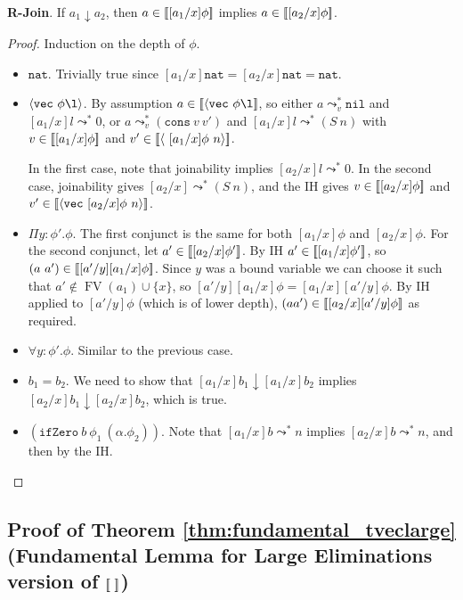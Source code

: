 \documentclass[copyright]{eptcs}
\newcommand{\vc}[0]{\texttt{vec}}
\newcommand{\nat}[0]{\texttt{nat}}
\newcommand{\nil}[0]{\texttt{nil}}
\newcommand{\cons}[0]{\texttt{cons}}
\newcommand{\leadstov}[0]{\leadsto_v}
\newcommand{\ifzero}[0]{\texttt{ifZero}}
\newcommand{\interp}[1]{[\negthinspace[#1]\negthinspace]}
\begin{document}
\noindent \textbf{R-Join}. If $a_1 \downarrow a_2$, then $a \in \interp{[a_1/x]\phi}$ 
implies $a \in \interp{[a_2/x]\phi}$.

\begin{proof}
Induction on the  depth of $\phi$. 
\begin{itemize}
\item $\nat$. Trivially true since $[a_1/x]\nat = [a_2/x]\nat = \nat$.
\item $\langle\vc\ \phi \l\rangle$.  By assumption $a \in
  \interp{\langle\vc\ \phi \l}$, so either $a \leadstov^* \nil$ and
  $[a_1/x]l \leadsto^* 0$, or $a \leadstov^* (\cons\ v\ v')$ and
  $[a_1/x]l \leadsto^* (S\ n)$ with $v \in \interp{[a_1/x]\phi}$ and
  $v' \in \interp{\langle\ [a_1/x]\phi\ n\rangle}$.

In the first case, note that joinability implies $[a_2/x]l \leadsto^* 0$.
In the second case, joinability gives $[a_2/x] \leadsto^* (S\ n)$,
and the IH gives $v \in \interp{[a_2/x]\phi}$ and $v' \in \interp{\langle\vc\ 
[a_2/x]\phi\ n\rangle}$.

\item $\Pi y:\phi'.\phi$. The first conjunct is the same for both $[a_1/x]\phi$ and $[a_2/x]\phi$.
For the second conjunct, let $a' \in \interp{[a_2/x]\phi'}$. By IH $a' \in \interp{[a_1/x]\phi'}$,
so $(a\ a') \in \interp{[a'/y][a_1/x]\phi}$. Since $y$ was a bound variable we can choose it such
that $a' \not\in \operatorname{FV}(a_1)\cup\{x\}$,
so $[a'/y][a_1/x]\phi = [a_1/x][a'/y]\phi$. By IH applied to $[a'/y]\phi$ (which is of lower depth),
$(a a') \in \interp{[a_2/x][a'/y]\phi}$ as required.

\item $\forall y:\phi'.\phi$. Similar to the previous case.

\item $b_1 = b_2$. We need to show that $[a_1/x]b_1 \downarrow [a_1/x]b_2$ implies $[a_2/x]b_1 \downarrow [a_2/x]b_2$, which is true.

\item $(\ifzero\ b\ \phi_1\ (\alpha.\phi_2))$. Note that $[a_1/x]b \leadsto^* n$ implies $[a_2/x]b \leadsto^* n$, and then by the IH.
\end{itemize}
\end{proof}

\subsection{Proof of Theorem \ref{thm:fundamental_tveclarge} (Fundamental Lemma for Large Eliminations version of $\interp{\ }$)}
\end{document}
